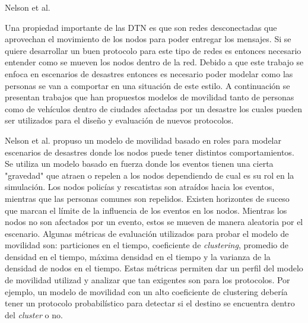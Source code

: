 {Nelson et al. \cite{ebr}}












\newpage
{}



Una propiedad importante de las DTN es que son redes desconectadas que
aprovechan el movimiento de los nodos para poder entregar los mensajes. Si se
quiere desarrollar un buen protocolo para este tipo de redes es entonces
necesario entender como se mueven los nodos dentro de la red. Debido a que este
trabajo se enfoca en escenarios de desastres entonces es necesario poder modelar
como las personas se van a comportar en una situación de este estilo. A
continuación se presentan trabajos que han propuestos modelos de movilidad tanto
de personas como de vehículos dentro de ciudades afectadas por un desastre los
cuales pueden ser utilizados para el diseño y evaluación de  nuevos protocolos.

Nelson et al. \cite{Nelson2007} propuso un modelo de movilidad basado en
roles para modelar escenarios de desastres donde los nodos puede tener distintos
comportamientos. Se utiliza un modelo basado en fuerza donde los eventos tienen
una cierta "gravedad" que atraen o repelen a los nodos dependiendo de cual es
su rol en la simulación. Los nodos policías y rescatistas son atraídos hacia los
eventos, mientras que las personas comunes son repelidos. Existen horizontes de
suceso que marcan el límite de la influencia de los eventos en los nodos.
Mientras los nodos no son afectados por un evento, estos se mueven de manera
aleatoria por el escenario. Algunas métricas de evaluación utilizados para
probar el modelo de movilidad son: particiones en el tiempo, coeficiente de
\textit{clustering}, promedio de densidad en el tiempo, máxima densidad en el
tiempo y la varianza de la densidad de nodos en el tiempo. Estas métricas
permiten dar un perfil del modelo de movilidad utilizad y analizar que tan
exigentes son para los protocolos. Por ejemplo, un modelo de movilidad con un
alto coeficiente de clustering debería tener un protocolo probabilístico para
detectar si el destino se encuentra dentro del \textit{cluster} o no.

